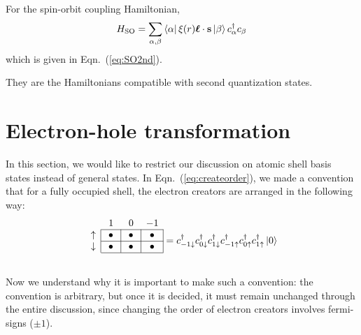 For the spin-orbit coupling Hamiltonian,
\begin{equation}
H_\text{SO} = \sum_{\alpha,\beta} \Bra{\alpha} \xi(r) \boldsymbol{\ell}\cdot\vec{s} \Ket{\beta} c_\alpha^\dagger c_\beta
\end{equation}
which is given in Eqn.~(\ref{eq:SO2nd}).

They are the Hamiltonians compatible with second quantization states.

\section{Electron-hole transformation}
In this section, we would like to restrict our discussion on atomic
shell basis states instead of general states.
In Eqn.~(\ref{eq:createorder}), we made a convention that for a
fully occupied shell, the electron creators
are arranged in the following way:
\vspace{-0.5em}
\begin{equation}
\begin{array}{c|c|c|c|}
\multicolumn{1}{c}{} & \multicolumn{1}{c}{\phantom{,}1\phantom{,}} & \multicolumn{1}{c}{\phantom{,}0\phantom{,}} & \multicolumn{1}{c}{-1} \\ \cline{2-4}
\uparrow & \bullet & \bullet & \bullet \\ \cline{2-4}
\downarrow & \bullet & \bullet & \bullet \\
\cline{2-4}
\multicolumn{1}{c}{}
\end{array} =
c_{-1\downarrow}^\dagger c_{0\downarrow}^\dagger c_{1\downarrow}^\dagger
c_{-1\uparrow}^\dagger c_{0\uparrow}^\dagger c_{1\uparrow}^\dagger
\Ket{0}
\end{equation}

\vspace{-2em}
Now we understand why it is important to make such a convention: the
convention is arbitrary, but once it is decided, it must remain
unchanged through the entire discussion, since changing the order of
electron creators involves fermi-signs ($\pm1$).

